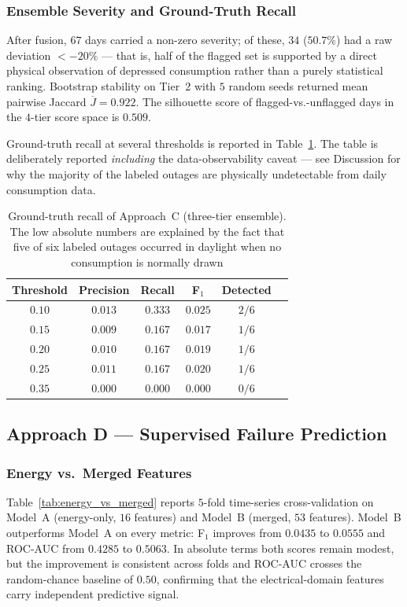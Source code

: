 \documentclass[11pt]{article}
\begin{document}
\begin{enumerate}[leftmargin=1.5em,itemsep=1pt]
\subsubsection*{Ensemble Severity and Ground-Truth Recall}
After fusion, $67$ days carried a non-zero severity; of these, $34$ ($50.7\%$) had a raw deviation $<-20\%$ --- that is, half of the flagged set is supported by a direct physical observation of depressed consumption rather than a purely statistical ranking. Bootstrap stability on Tier~2 with $5$ random seeds returned mean pairwise Jaccard $\overline{J}=0.922$. The silhouette score of flagged-vs.-unflagged days in the $4$-tier score space is $0.509$.

Ground-truth recall at several thresholds is reported in Table~\ref{tab:tier_gt}. The table is deliberately reported \emph{including} the data-observability caveat --- see Discussion for why the majority of the labeled outages are physically undetectable from daily consumption data.

\begin{table}[H]
\centering
\caption{Ground-truth recall of Approach~C (three-tier ensemble). The low absolute numbers are explained by the fact that five of six labeled outages occurred in daylight when no consumption is normally drawn}
\label{tab:tier_gt}
\begin{tabular}{cccccc}
\toprule
\textbf{Threshold} & \textbf{Precision} & \textbf{Recall} & \textbf{F$_1$} & \textbf{Detected}\\
\midrule
$0.10$ & $0.013$ & $0.333$ & $0.025$ & $2/6$\\
$0.15$ & $0.009$ & $0.167$ & $0.017$ & $1/6$\\
$0.20$ & $0.010$ & $0.167$ & $0.019$ & $1/6$\\
$0.25$ & $0.011$ & $0.167$ & $0.020$ & $1/6$\\
$0.35$ & $0.000$ & $0.000$ & $0.000$ & $0/6$\\
\bottomrule
\end{tabular}
\end{table}

\subsection{Approach D --- Supervised Failure Prediction}

\subsubsection*{Energy vs.\ Merged Features}
Table~\ref{tab:energy_vs_merged} reports $5$-fold time-series cross-validation on Model~A (energy-only, $16$ features) and Model~B (merged, $53$ features). Model~B outperforms Model~A on every metric: F$_1$ improves from $0.0435$ to $0.0555$ and ROC-AUC from $0.4285$ to $0.5063$. In absolute terms both scores remain modest, but the improvement is consistent across folds and ROC-AUC crosses the random-chance baseline of $0.50$, confirming that the electrical-domain features carry independent predictive signal.


\end{enumerate}
\end{document}
